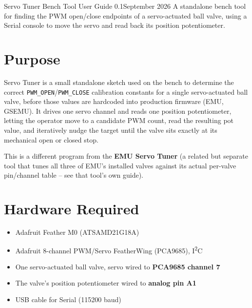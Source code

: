 \documentclass[11pt,letterpaper]{article}
\newcommand{\docversion}{0.1}
\newcommand{\docdate}{September 2026}
\begin{document}


\KJOtitlepage%
  {Servo Tuner}%
  {Bench Tool User Guide}%
  {\docversion}{\docdate}%
  {A standalone bench tool for finding the PWM open/close endpoints of a
   servo-actuated ball valve, using a Serial console to move the servo and
   read back its position potentiometer.}

\tableofcontents\newpage

\section{Purpose}

\begin{sloppypar}
Servo Tuner is a small standalone sketch used on the bench to determine the
correct \texttt{PWM\_OPEN}/\texttt{PWM\_CLOSE} calibration constants for a
single servo-actuated ball valve, before those values are hardcoded into
production firmware (EMU, GSEMU). It drives one servo channel and reads one
position potentiometer, letting the operator move to a candidate PWM count,
read the resulting pot value, and iteratively nudge the target until the
valve sits exactly at its mechanical open or closed stop.
\end{sloppypar}

This is a different program from the \textbf{EMU Servo Tuner} (a related but
separate tool that tunes all three of EMU's installed valves against its
actual per-valve pin/channel table -- see that tool's own guide).

\section{Hardware Required}

\begin{itemize}[nosep]
  \item Adafruit Feather M0 (ATSAMD21G18A)
  \item Adafruit 8-channel PWM/Servo FeatherWing (PCA9685), I\textsuperscript{2}C
  \item One servo-actuated ball valve, servo wired to \textbf{PCA9685 channel 7}
  \item The valve's position potentiometer wired to \textbf{analog pin A1}
  \item USB cable for Serial (115200 baud)
\end{itemize}
\end{document}
